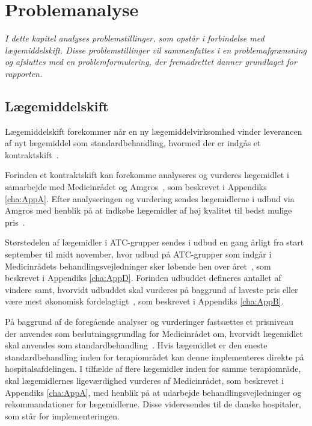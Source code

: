 \chapter{Problemanalyse}
\textit{I dette kapitel analyses problemstillinger, som opstår i forbindelse med lægemiddelskift. Disse problemstillinger vil sammenfattes i en problemafgrænsning og afsluttes med en problemformulering, der fremadrettet danner grundlaget for rapporten.}

\section{Lægemiddelskift}
Lægemiddelskift forekommer når en ny lægemiddelvirksomhed vinder leverancen af nyt lægemiddel som standardbehandling, hvormed der er indgås et kontraktskift~\citep{Amgros2015}. 

Forinden et kontraktskift kan forekomme analyseres og vurderes lægemidlet i samarbejde med Medicinrådet og Amgros~\citep{DanskeRegioner2016}, som beskrevet i Appendiks \ref{cha:AppA}. Efter analyseringen og vurdering sendes lægemidlerne i udbud via Amgros med henblik på at indkøbe lægemidler af høj kvalitet til bedst mulige pris~\citep{Sygehusapoteket2017}.

Størstedelen af lægemidler i ATC-grupper sendes i udbud en gang årligt fra start september til midt november, hvor udbud på ATC-grupper som indgår i Medicinrådets behandlingsvejledninger sker løbende hen over året~\citep{Sygehusapoteket2017}, som beskrevet i Appendiks \ref{cha:AppD}.
Forinden udbuddet defineres antallet af vindere samt, hvorvidt udbuddet skal vurderes på baggrund af laveste pris eller være mest økonomisk fordelagtigt~\citep{Amgros2018a}, som beskrevet i Appendiks \ref{cha:AppB}.

På baggrund af de foregående analyser og vurderinger fastsættes et prisniveau der anvendes som beslutningsgrundlag for Medicinrådet om, hvorvidt lægemidlet skal anvendes som standardbehandling~\citep{DanskeRegioner2016}. Hvis lægemidlet er den eneste standardbehandling inden for terapiområdet kan denne implementeres direkte på hospitalsafdelingen. I tilfælde af flere lægemidler inden for samme terapiområde, skal lægemidlernes ligeværdighed vurderes af Medicinrådet, som beskrevet i Appendiks \ref{cha:AppA}, med henblik på at udarbejde behandlingsvejledninger og rekommandationer for lægemidlerne. Disse videresendes til de danske hospitaler, som står for implementeringen.~\citep{DanskeRegioner2016}

